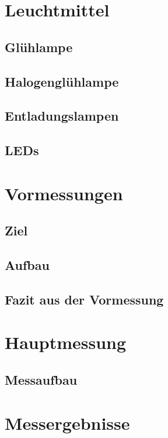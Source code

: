 \chapter{Leuchtmittel}

\section{Glühlampe} \label{sec_glühlampe}

\section{Halogenglühlampe} \label{sec_halogenglühlampe}

\section{Entladungslampen} \label{sec_entladungslampe}

\section{LEDs} \label{sec_led}

\chapter{Vormessungen}

\section{Ziel}

\section{Aufbau}

\section{Fazit aus der Vormessung}

\chapter{Hauptmessung}

\section{Messaufbau}

\chapter{Messergebnisse}

